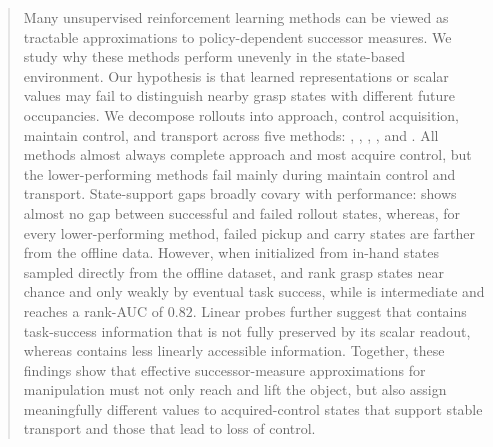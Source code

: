 \begin{abstract}
    Many unsupervised reinforcement learning methods can be viewed as tractable approximations to policy-dependent successor measures.
    We study why these methods perform unevenly in the state-based \ogbench{} \task{} environment.
    Our hypothesis is that learned representations or scalar values may fail to distinguish nearby grasp states with different future occupancies.
    We decompose rollouts into approach, control acquisition, maintain control, and transport across five methods: \gciql{}, \crl{}, \fb{}, \rldp{}, and
    \psm{}.
    All methods almost always complete approach and most acquire control, but the lower-performing methods fail mainly during maintain control and transport.
    State-support gaps broadly covary with performance: \gciql{} shows almost no gap between successful and failed rollout states, whereas, for every
    lower-performing method, failed pickup and carry states are farther from the offline data.
    However, when initialized from in-hand states sampled directly from the offline dataset, \rldp{} and \psm{} rank grasp states near chance and \fb{} only weakly by eventual task success, while \crl{} is intermediate and \gciql{} reaches a rank-AUC of $0.82$.
    Linear probes further suggest that \fb{} contains task-success information that is not fully preserved by its scalar readout, whereas \rldp{} contains
    less linearly accessible information.
    Together, these findings show that effective successor-measure approximations for manipulation must not only reach and lift the object, but also assign
    meaningfully different values to acquired-control states that support stable transport and those that lead to loss of control.
    \end{abstract}